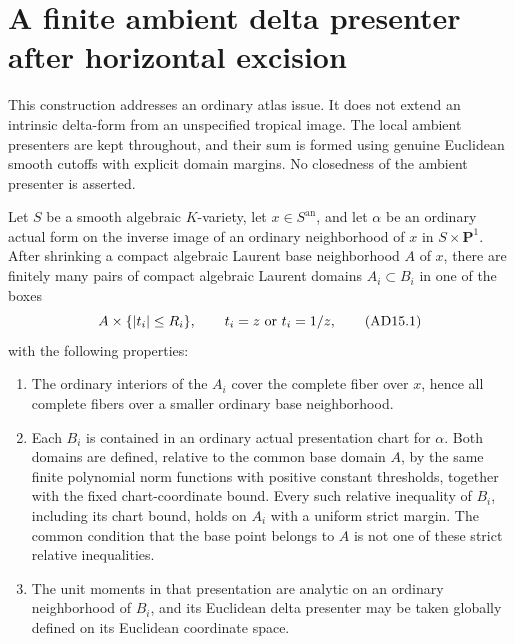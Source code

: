 \section{A finite ambient delta presenter after horizontal excision}
\label{r15ad:section}

This construction addresses an ordinary atlas issue.  It does not
extend an intrinsic delta-form from an unspecified tropical image.
The local ambient presenters are kept throughout, and their sum
is formed using genuine Euclidean smooth cutoffs with explicit
domain margins.  No closedness of the ambient presenter is asserted.

\begin{lemma}
\label{r15ad:nested}
Let $S$ be a smooth algebraic $K$-variety, let $x\in
S^{\mathrm{an}}$, and let $\alpha$ be an ordinary actual
form on the inverse image of an ordinary neighborhood of
$x$ in $S\times\mathbf P^1$.  After shrinking a compact
algebraic Laurent base neighborhood $A$ of $x$, there
are finitely many pairs of compact algebraic Laurent
domains $A_i\subset B_i$ in one of the boxes
\[
       A\times\{|t_i|\leq R_i\},\qquad
                     t_i=z\ \hbox{or}\ t_i=1/z,
\tag{AD15.1}\label{r15ad:boxes}
\]
with the following properties:
\begin{enumerate}
\item The ordinary interiors of the $A_i$ cover the
complete fiber over $x$, hence all complete fibers over
a smaller ordinary base neighborhood.
\item Each $B_i$ is contained in an ordinary actual
presentation chart for $\alpha$.  Both domains are
defined, relative to the common base domain $A$, by the
same finite polynomial norm functions with positive
constant thresholds, together with the fixed
chart-coordinate bound.  Every such relative inequality
of $B_i$, including its chart bound, holds on $A_i$
with a uniform strict margin.  The common condition
that the base point belongs to $A$ is not one of these
strict relative inequalities.
\item The unit moments in that presentation are analytic
on an ordinary neighborhood of $B_i$, and its Euclidean
delta presenter may be taken globally defined on its
Euclidean coordinate space.
\end{enumerate}
\end{lemma}

